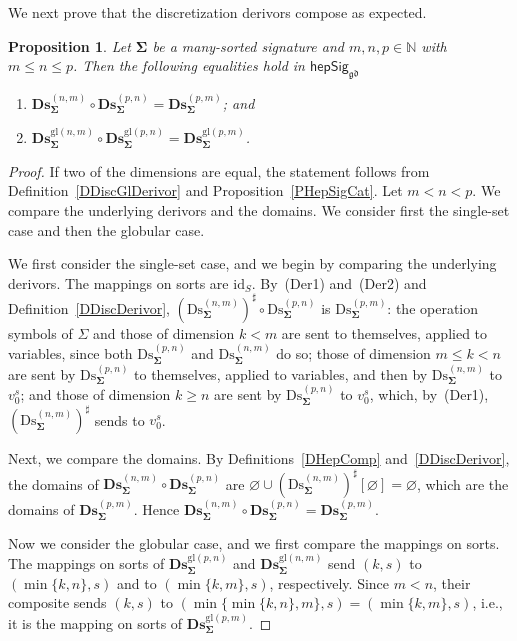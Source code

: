 \documentclass[a4paper, reqno
]{amsart}
\newcommand{\sig}[1]{\mathbf{#1}}             %
\newcommand{\id}{\mathrm{id}}
\newcommand{\gd}{\mathfrak{gd}}              %
\newcommand{\gl}{\mathrm{gl}}                %
\newcommand{\Ds}{\mathrm{Ds}}
\newcommand{\bDs}{\mathbf{Ds}}
\theoremstyle{plain}
\newtheorem{proposition}[theorem]{Proposition}
\theoremstyle{definition}
\begin{document}
We next prove that the discretization derivors compose as expected.

\begin{proposition}\label{PDiscComp}
Let $\sig{\Sigma}$ be a many-sorted signature and $m,n,p\in\mathbb{N}$ with $m\leq n\leq p$.
Then the following equalities hold in $\mathsf{hepSig}_{\gd}$
\begin{enumerate}
	\item
	$\bDs^{(n,m)}_{\sig{\Sigma}}\circ\bDs^{(p,n)}_{\sig{\Sigma}}=\bDs^{(p,m)}_{\sig{\Sigma}}$; and

	\item
	$\bDs^{\gl(n,m)}_{\sig{\Sigma}}\circ\bDs^{\gl(p,n)}_{\sig{\Sigma}}=\bDs^{\gl(p,m)}_{\sig{\Sigma}}$.
\end{enumerate}
\end{proposition}
\begin{proof}
If two of the dimensions are equal, the statement follows from Definition~\ref{DDiscGlDerivor} and Proposition~\ref{PHepSigCat}.
Let $m<n<p$.
We compare the underlying derivors and the domains.
We consider first the single-set case and then the globular case.

We first consider the single-set case, and we begin by comparing the underlying derivors.
The mappings on sorts are $\id_{S}$.
By~(Der1) and~(Der2) and Definition~\ref{DDiscDerivor}, $(\Ds^{(n,m)}_{\sig{\Sigma}})^{\sharp}\circ\Ds^{(p,n)}_{\sig{\Sigma}}$ is $\Ds^{(p,m)}_{\sig{\Sigma}}$: the operation symbols of $\Sigma$ and those of dimension $k<m$ are sent to themselves, applied to variables, since both $\Ds^{(p,n)}_{\sig{\Sigma}}$ and $\Ds^{(n,m)}_{\sig{\Sigma}}$ do so; those of dimension $m\leq k<n$ are sent by $\Ds^{(p,n)}_{\sig{\Sigma}}$ to themselves, applied to variables, and then by $\Ds^{(n,m)}_{\sig{\Sigma}}$ to $v^{s}_{0}$; and those of dimension $k\geq n$ are sent by $\Ds^{(p,n)}_{\sig{\Sigma}}$ to $v^{s}_{0}$, which, by~(Der1), $(\Ds^{(n,m)}_{\sig{\Sigma}})^{\sharp}$ sends to $v^{s}_{0}$.

Next, we compare the domains.
By Definitions~\ref{DHepComp} and~\ref{DDiscDerivor}, the domains of $\bDs^{(n,m)}_{\sig{\Sigma}}\circ\bDs^{(p,n)}_{\sig{\Sigma}}$ are $\varnothing\cup(\Ds^{(n,m)}_{\sig{\Sigma}})^{\sharp}[\varnothing]=\varnothing$, which are the domains of $\bDs^{(p,m)}_{\sig{\Sigma}}$.
Hence $\bDs^{(n,m)}_{\sig{\Sigma}}\circ\bDs^{(p,n)}_{\sig{\Sigma}}=\bDs^{(p,m)}_{\sig{\Sigma}}$.

Now we consider the globular case, and we first compare the mappings on sorts.
The mappings on sorts of $\bDs^{\gl(p,n)}_{\sig{\Sigma}}$ and $\bDs^{\gl(n,m)}_{\sig{\Sigma}}$ send $(k,s)$ to $(\min\{k,n\},s)$ and to $(\min\{k,m\},s)$, respectively.
Since $m<n$, their composite sends $(k,s)$ to $(\min\{\min\{k,n\},m\},s)=(\min\{k,m\},s)$, i.e., it is the mapping on sorts of $\bDs^{\gl(p,m)}_{\sig{\Sigma}}$.


\end{proof}
\end{document}
